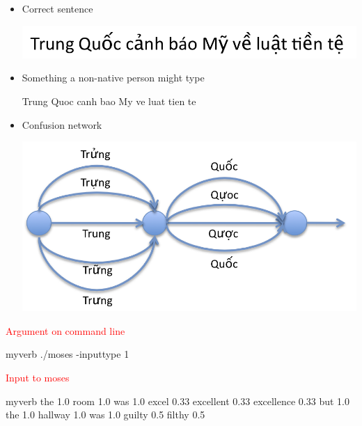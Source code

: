 \documentclass[landscape]{uedslides2C}
\begin{document}
\vspace{-3mm}
\begin{itemize}
\item Correct sentence \vspace{-5mm}
\begin{center}
\includegraphics[scale=0.8]{vietnamese.png}
\end{center}
\item Something a non-native person might type  \vspace{-2mm}
\begin{center}
	Trung Quoc canh bao My ve luat tien te
\end{center}

\item Confusion network \vspace{-8mm}
\begin{center}
\includegraphics[scale=0.8]{confusion-network-2.png}
\end{center}
\end{itemize}


\begin{center}
\textcolor{red}{Argument on command line}\\[3mm]
\begin{SaveVerbatim}{myverb}
 ./moses -inputtype 1
\end{SaveVerbatim}
\colorbox{gray}{}

\vspace{10mm}
\textcolor{red}{Input to moses}\\[3mm]
{\small
\begin{SaveVerbatim}{myverb}
the 1.0
room 1.0
was 1.0
excel 0.33 excellent 0.33 excellence 0.33
but 1.0
the 1.0
hallway 1.0
was 1.0
guilty 0.5 filthy 0.5
\end{SaveVerbatim}
\colorbox{gray}{}}
\end{center}
\end{document}
